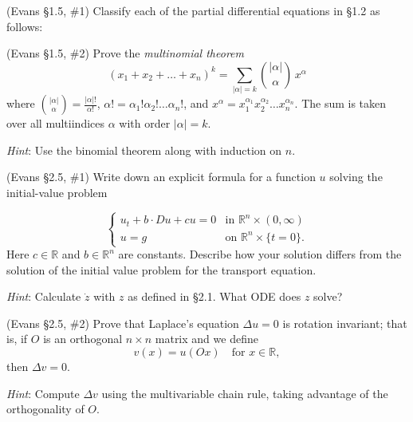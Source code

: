 \documentclass[12pt,fleqn]{exam}
\newcommand{\R}{\ensuremath{\mathbb{R}}}
\begin{document}
\begin{questions}

\question (Evans \S1.5, \#1) Classify each of the partial differential equations in \S1.2 as follows:


\question (Evans \S1.5, \#2) Prove the \emph{multinomial theorem}
\[(x_1 + x_2 + \dots + x_n)^k = \sum_{|\alpha| = k} \binom{|\alpha|}{\alpha}\,x^\alpha\]
where $\binom{|\alpha|}{\alpha} = \frac{|\alpha|!}{\alpha!}$, $\alpha! = \alpha_1!\alpha_2!\dots \alpha_n!$, and $x^\alpha = x_1^{\alpha_1} x_2^{\alpha_2} \dots x_n^{\alpha_n}$. The sum is taken over all multiindices $\alpha$ with order $|\alpha| = k$.

\emph{Hint}: Use the binomial theorem along with induction on $n$.

\question (Evans \S2.5, \#1) Write down an explicit formula for a function $u$ solving the initial-value problem

\[\begin{cases}
u_t + b \cdot Du + cu = 0 & \text{in } \R^n \times (0, \infty) \\
u = g & \text{on } \mathbb{R}^n \times \{t = 0\}.
\end{cases}\]
Here $c \in \R$ and $b \in \R^n$ are constants. Describe how your solution differs from the solution of the initial value problem for the transport equation.

\emph{Hint}: Calculate $\dot{z}$ with $z$ as defined in \S2.1. What ODE does $z$ solve? 

\question (Evans \S2.5, \#2) Prove that Laplace's equation $\Delta u = 0$ is rotation invariant; that is, if $O$ is an orthogonal $n \times n$ matrix and we define
\[v(x) = u(Ox) \quad\text{for } x \in \R,\]
then $\Delta v = 0$.

\emph{Hint}: Compute $\Delta v$ using the multivariable chain rule, taking advantage of the orthogonality of $O$.

\end{questions}
\end{document}
